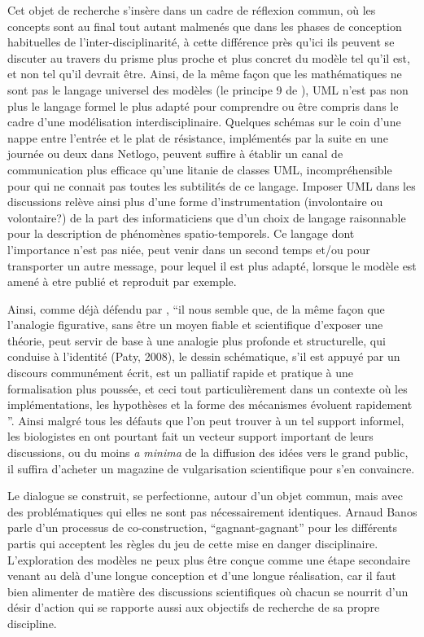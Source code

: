 Cet objet de recherche s'insère dans un cadre de réflexion commun, où les concepts sont au final tout autant malmenés que dans les phases de conception habituelles de l'inter-disciplinarité, à cette différence près qu'ici ils peuvent se discuter au travers du prisme plus proche et plus concret du modèle tel qu'il est, et non tel qu'il devrait être. Ainsi, de la même façon que les mathématiques ne sont pas le langage universel des modèles (le principe 9 de \textcite[82]{Banos2013}), UML n'est pas non plus le langage formel le plus adapté pour comprendre ou être compris dans le cadre d'une modélisation interdisciplinaire. Quelques schémas sur le coin d'une nappe entre l'entrée et le plat de résistance, implémentés par la suite en une journée ou deux dans Netlogo, peuvent suffire à établir un canal de communication plus efficace qu'une litanie de classes UML, incompréhensible pour qui ne connait pas toutes les subtilités de ce langage. Imposer UML dans les discussions relève ainsi plus d'une forme d'instrumentation (involontaire ou volontaire?) de la part des informaticiens que d'un choix de langage raisonnable pour la description de phénomènes spatio-temporels. Ce langage dont l'importance n'est pas niée, peut venir dans un second temps et/ou pour transporter un autre message, pour lequel il est plus adapté, lorsque le modèle est amené à etre publié et reproduit par exemple.

Ainsi, comme déjà défendu par \textcite{Chapron2014}, \enquote{il nous semble que, de la même façon que l’analogie figurative, sans être un moyen fiable et scientifique d’exposer une théorie, peut servir de base à une analogie plus profonde et structurelle, qui conduise à l’identité (Paty, 2008), le dessin schématique, s’il est appuyé par un discours communément écrit, est un palliatif rapide et pratique à une formalisation plus poussée, et ceci tout particulièrement dans un contexte où les implémentations, les hypothèses et la forme des mécanismes évoluent rapidement \autocite[16-17]{Machamer2000}}. Ainsi malgré tous les défauts que l'on peut trouver à un tel support informel, les biologistes en ont pourtant fait un vecteur support important de leurs discussions, ou du moins \textit{a minima} de la diffusion des idées vers le grand public, il suffira d'acheter un magazine de vulgarisation scientifique pour s'en convaincre.

Le dialogue se construit, se perfectionne, autour d'un objet commun, mais avec des problématiques qui elles ne sont pas nécessairement identiques. Arnaud Banos parle d'un processus de co-construction, \enquote{gagnant-gagnant} pour les différents partis qui acceptent les règles du jeu de cette mise en danger disciplinaire. L'exploration des modèles ne peux plus être conçue comme une étape secondaire venant au delà d'une longue conception et d'une longue réalisation, car il faut bien alimenter de matière des discussions scientifiques où chacun se nourrit d'un désir d'action qui se rapporte aussi aux objectifs de recherche de sa propre discipline.

